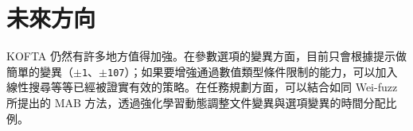\section{未來方向}

KOFTA 仍然有許多地方值得加強。在參數選項的變異方面，目前只會根據提示做簡單的變異（\texttt{$\pm$1}、\texttt{$\pm$107}）；如果要增強通過數值類型條件限制的能力，可以加入線性搜尋等等已經被證實有效的策略。在任務規劃方面，可以結合如同 Wei-fuzz 所提出的 MAB 方法，透過強化學習動態調整文件變異與選項變異的時間分配比例。